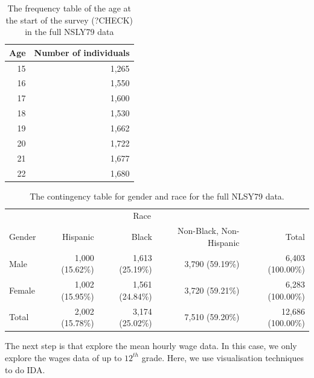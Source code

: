 \documentclass[12pt]{article}
\begin{document}
\begin{table}

\caption{\label{tab:age-table}The frequency table of the age at the start of the survey (?CHECK) in the full NSLY79 data}
\centering
\begin{tabular}[t]{rr}
\toprule
Age & Number of individuals\\
\midrule
15 & 1,265\\
16 & 1,550\\
17 & 1,600\\
18 & 1,530\\
19 & 1,662\\
20 & 1,722\\
21 & 1,677\\
22 & 1,680\\
\bottomrule
\end{tabular}
\end{table}

\begin{table}

\caption{\label{tab:gender-race-table}The contingency table for gender and race for the full NLSY79 data.}
\centering
\begin{tabular}[t]{lrrrr}
\toprule
\multicolumn{1}{c}{ } & \multicolumn{3}{c}{Race} & \multicolumn{1}{c}{ } \\
\cmidrule(l{3pt}r{3pt}){2-4}
Gender & Hispanic & Black & Non-Black, Non-Hispanic & Total\\
\midrule
Male & 1,000 (15.62\%) & 1,613 (25.19\%) & 3,790 (59.19\%) & 6,403 (100.00\%)\\
Female & 1,002 (15.95\%) & 1,561 (24.84\%) & 3,720 (59.21\%) & 6,283 (100.00\%)\\
\midrule
Total & 2,002 (15.78\%) & 3,174 (25.02\%) & 7,510 (59.20\%) & 12,686 (100.00\%)\\
\bottomrule
\end{tabular}
\end{table}

The next step is that explore the mean hourly wage data. In this case, we only explore the wages data of up to \(12^{th}\) grade. Here, we use visualisation techniques to do IDA.
\end{document}
